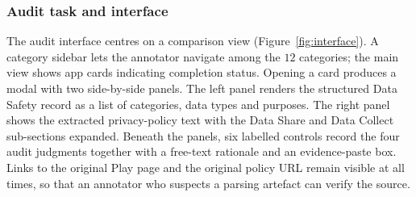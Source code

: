 \documentclass[11pt,a4paper]{article}
\begin{document}
\subsubsection{Audit task and interface}
\label{subsec:task}
The audit interface centres on a comparison view
(Figure~\ref{fig:interface}). A category sidebar lets the annotator
navigate among the $12$ categories; the main view shows app cards
indicating completion status. Opening a card produces a modal with two
side-by-side panels. The left panel renders the structured Data Safety
record as a list of categories, data types and purposes. The right panel
shows the extracted privacy-policy text with the Data Share and Data
Collect sub-sections expanded. Beneath the panels, six labelled controls
record the four audit judgments together with a free-text rationale and
an evidence-paste box. Links to the original Play page and the original
policy URL remain visible at all times, so that an annotator who suspects
a parsing artefact can verify the source.
\end{document}
